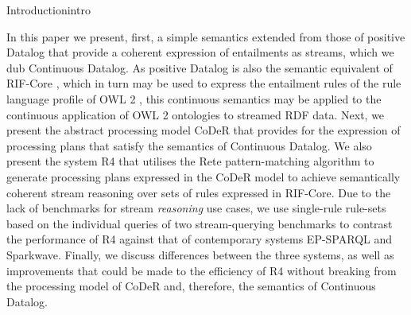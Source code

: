 \begin{nestedsection}{Introduction}{intro}

	In this paper we present, first, a simple semantics extended from those of positive Datalog that provide a coherent expression of entailments as streams, which we dub Continuous Datalog.
	As positive Datalog is also the semantic equivalent of RIF-Core \citep{w3crifcore}, which in turn may be used to express the entailment rules of the rule language profile of OWL 2 \citep{w3cowl2profiles}, this continuous semantics may be applied to the continuous application of OWL 2 ontologies to streamed RDF data.
	Next, we present the abstract processing model CoDeR that provides for the expression of processing plans that satisfy the semantics of Continuous Datalog.
	We also present the system R4 that utilises the Rete pattern-matching algorithm to generate processing plans expressed in the CoDeR model to achieve semantically coherent stream reasoning over sets of rules expressed in RIF-Core.
	Due to the lack of benchmarks for stream \emph{reasoning} use cases, we use single-rule rule-sets based on the individual queries of two stream-querying benchmarks to contrast the performance of R4 against that of contemporary systems EP-SPARQL and Sparkwave.
	Finally, we discuss differences between the three systems, as well as improvements that could be made to the efficiency of R4 without breaking from the processing model of CoDeR and, therefore, the semantics of Continuous Datalog.
\end{nestedsection}
